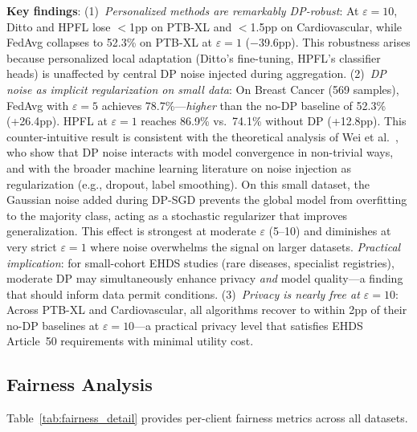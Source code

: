 \documentclass[conference]{IEEEtran}
\begin{document}
\textbf{Key findings}: (1)~\textit{Personalized methods are remarkably DP-robust}: At $\varepsilon{=}10$, Ditto and HPFL lose $<$1pp on PTB-XL and $<$1.5pp on Cardiovascular, while FedAvg collapses to 52.3\% on PTB-XL at $\varepsilon{=}1$ ($-$39.6pp). This robustness arises because personalized local adaptation (Ditto's fine-tuning, HPFL's classifier heads) is unaffected by central DP noise injected during aggregation.
(2)~\textit{DP noise as implicit regularization on small data}: On Breast Cancer (569 samples), FedAvg with $\varepsilon{=}5$ achieves 78.7\%---\textit{higher} than the no-DP baseline of 52.3\% (+26.4pp). HPFL at $\varepsilon{=}1$ reaches 86.9\% vs.\ 74.1\% without DP (+12.8pp). This counter-intuitive result is consistent with the theoretical analysis of Wei et al.~\cite{wei2020federated}, who show that DP noise interacts with model convergence in non-trivial ways, and with the broader machine learning literature on noise injection as regularization (e.g., dropout, label smoothing). On this small dataset, the Gaussian noise added during DP-SGD prevents the global model from overfitting to the majority class, acting as a stochastic regularizer that improves generalization. This effect is strongest at moderate $\varepsilon$ (5--10) and diminishes at very strict $\varepsilon{=}1$ where noise overwhelms the signal on larger datasets. \textit{Practical implication}: for small-cohort EHDS studies (rare diseases, specialist registries), moderate DP may simultaneously enhance privacy \textit{and} model quality---a finding that should inform data permit conditions.
(3)~\textit{Privacy is nearly free at $\varepsilon{=}10$}: Across PTB-XL and Cardiovascular, all algorithms recover to within 2pp of their no-DP baselines at $\varepsilon{=}10$---a practical privacy level that satisfies EHDS Article~50 requirements with minimal utility cost.

\subsection{Fairness Analysis}

Table~\ref{tab:fairness_detail} provides per-client fairness metrics across all datasets.
\end{document}

